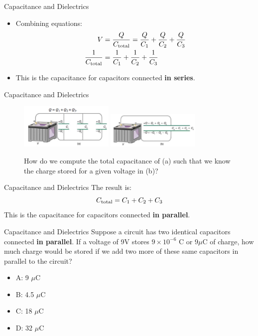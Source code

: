 \documentclass{beamer}
\begin{document}
\begin{frame}{Capacitance and Dielectrics}
\begin{itemize}
\item Combining equations:
\begin{align}
V &= \frac{Q}{C_{\rm total}} = \frac{Q}{C_1}+\frac{Q}{C_2}+\frac{Q}{C_3} \\
\frac{1}{C_{\rm total}} &= \frac{1}{C_1}+\frac{1}{C_2}+\frac{1}{C_3}
\end{align}
\item This is the capacitance for capacitors connected \textbf{in series}.
\end{itemize}
\end{frame}

\begin{frame}{Capacitance and Dielectrics}
\begin{figure}
\centering
\includegraphics[width=0.4\textwidth]{figures/cap3.png} \hspace{0.2cm}
\includegraphics[width=0.4\textwidth]{figures/cap4.png}
\caption{\label{fig:cap2} How do we compute the total capacitance of (a) such that we know the charge stored for a given voltage in (b)?}
\end{figure}
\end{frame}

\begin{frame}{Capacitance and Dielectrics}
The result is:
\begin{equation}
C_{\rm total} = C_1+C_2+C_3
\end{equation}
This is the capacitance for capacitors connected \textbf{in parallel}.
\end{frame}

\begin{frame}{Capacitance and Dielectrics}
Suppose a circuit has two identical capacitors connected \textbf{in parallel}.  If a voltage of 9V stores $9 \times 10^{-6}$ C or $9\mu$C of charge, how much charge would be stored if we add two more of these same capacitors in parallel to the circuit?
\begin{itemize}
\item A: 9 $\mu$C
\item B: 4.5 $\mu$C
\item C: 18 $\mu$C
\item D: 32 $\mu$C
\end{itemize}
\end{frame}
\end{document}

